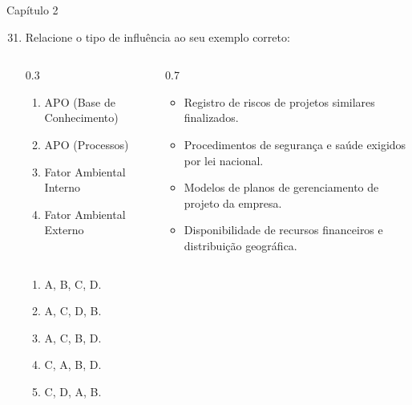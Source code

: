 \documentclass{beamer}
\begin{document}
\begin{frame}{Capítulo 2}
	\begin{enumerate}
		\setcounter{enumi}{30}
		\justifying
		\item Relacione o tipo de influência ao seu exemplo correto:
		\begin{columns}
			\begin{column}{0.3\textwidth}
				\begin{enumerate}[A]
					\small
					\item APO (Base de Conhecimento)
					\item APO (Processos)
					\item Fator Ambiental Interno
					\item Fator Ambiental Externo
				\end{enumerate}
			\end{column}
			
			\begin{column}{0.7\textwidth}
				\begin{itemize}
					\small
					\justifying
					
					
					\item Registro de riscos de projetos similares finalizados.
					\item Procedimentos de segurança e saúde exigidos por lei nacional.
					\item Modelos de planos de gerenciamento de projeto da empresa.
					\item Disponibilidade de recursos financeiros e distribuição geográfica.
				\end{itemize}
			\end{column}
		\end{columns}
		\begin{enumerate}[a]
			\item A, B, C, D.
			\item A, C, D, B.
			\item \alert<2>{A, C, B, D}.
			\item C, A, B, D.
			\item C, D, A, B.
		\end{enumerate}
	\end{enumerate}
\end{frame}
\end{document}
